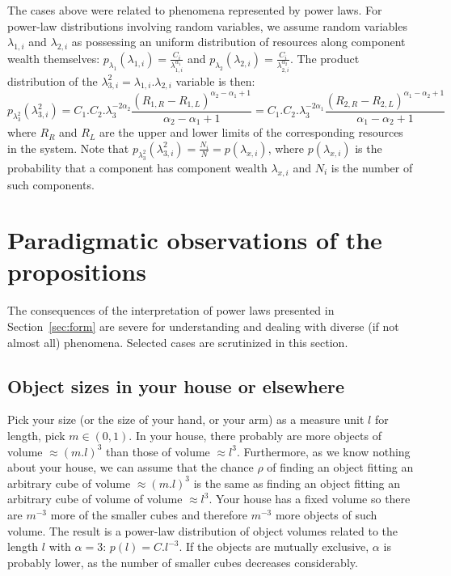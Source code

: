 \documentclass[a4paper, 11pt]{article} %
\begin{document}
The cases above were related to phenomena represented by power laws.
For power-law distributions involving random variables, we assume
random variables
$\lambda_{1,i}$ and $\lambda_{2,i}$ as possessing an uniform distribution of resources along component wealth
themselves:
$p_{\lambda_{1}}(\lambda_{1,i})=\frac{C_i}{\lambda_{1,i}^{\alpha_1}}$
and
$p_{\lambda_{2}}(\lambda_{2,i})=\frac{C_i}{\lambda_{2,i}^{\alpha_2}}$.
The product distribution of the
$\lambda_{3,i}^2=\lambda_{1,i}.\lambda_{2,i}$
variable is then:
\begin{equation}\textstyle
p_{\lambda_3^2}(\lambda_{3,i}^2)=C_1.C_2.\lambda_3^{-2\alpha_2}\frac{(R_{1,R}-R_{1,L})^{\alpha_2-\alpha_1+1}}{\alpha_2-\alpha_1+1}
=C_1.C_2.\lambda_3^{-2\alpha_1}\frac{(R_{2,R}-R_{2,L})^{\alpha_1-\alpha_2+1}}{\alpha_1-\alpha_2+1}
\end{equation}
where $R_R$ and $R_L$ are the upper and lower limits of the corresponding resources in the system.
Note that $p_{\lambda_3^2}(\lambda_{3,i}^2)=\frac{N_i}{N}=p(\lambda_{x,i})$,
where $p(\lambda_{x,i})$ is the probability that a component has component wealth $\lambda_{x,i}$ and $N_i$ is the number of such components. 


\section{Paradigmatic observations of the propositions}\label{sec:par}
The consequences of the interpretation of power laws presented in Section~\ref{sec:form}
are severe for understanding and dealing with
diverse (if not almost all)
phenomena. Selected cases are scrutinized in this section.
 
\subsection{Object sizes in your house or elsewhere}\label{sec:siz}
Pick your size (or the size of your hand, or your arm)
as a measure unit $l$ for length, pick $m \in (0,1)$.
In your house, there probably are more objects
of volume $\approx (m.l)^3$ 
than those of volume $\approx l^3$.
Furthermore, as we know nothing about your house,
we can assume that the chance $\rho$ of finding an object
fitting an arbitrary cube of volume $\approx (m.l)^3$
is the same as finding an object fitting an
arbitrary cube of volume of volume $\approx l^3$.
Your house has a fixed volume so there are $m^{-3}$ more of
the smaller cubes and therefore $m^{-3}$ more objects of such
volume. 
The result is a power-law distribution of object volumes
related to the length $l$ with $\alpha=3$:
$p(l)=C.l^{-3}$.
If the objects are mutually exclusive,
$\alpha$ is probably lower, as the number of smaller
cubes decreases considerably.
\end{document}
